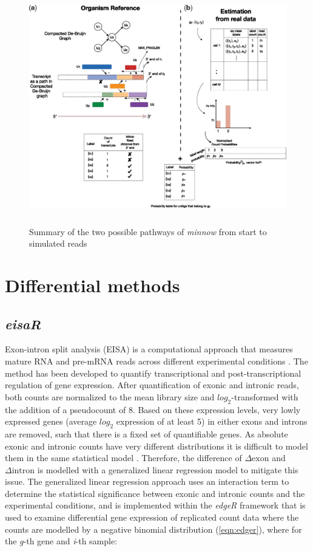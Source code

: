 \begin{figure}[!htb]
\begin{center}
\includegraphics[width=6in,height=4in]{../figures/simulation/minnow_process.jpg}
\end{center}
\caption{Summary of the two possible pathways of \emph{minnow} from start to simulated reads \citep{minnow}}
\label{fig:minnow_process}
\end{figure}
\FloatBarrier

\section{Differential methods}
\subsection{\emph{eisaR}}
Exon-intron split analysis (EISA) is a computational approach that measures mature RNA and pre-mRNA reads across different experimental conditions \citep{eisar}. The method has been developed to quantify transcriptional and post-transcriptional regulation of gene expression. After quantification of exonic and intronic reads, both counts are normalized to the mean library size and $log_2$-transformed with the addition of a pseudocount of 8. Based on these expression levels, very lowly expressed genes (average $log_2$ expression of at least 5) in either exons and introns are removed, such that there is a fixed set of quantifiable genes. As absolute exonic and intronic counts have very different distributions it is difficult to model them in the same statistical model \citep{eisar}. Therefore, the difference of $\Delta \text{exon}$ and $\Delta \text{intron}$ is modelled with a generalized linear regression model to mitigate this issue. The generalized linear regression approach uses an interaction term to determine the statistical significance between exonic and intronic counts and the experimental conditions, and is implemented within the \emph{edgeR} framework \citep{edger_package} that is used to examine differential gene expression of replicated count data where the counts are modelled by a negative binomial distribution (\ref{eqn:edger}), where for the \emph{g}-th gene and \emph{i}-th sample:

